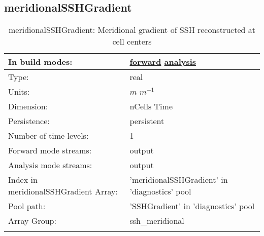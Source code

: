 \subsection[meridionalSSHGradient]{meridionalSSHGradient}
\label{subsec:var_sec_diagnostics_meridionalSSHGradient}
\begin{center}
\begin{longtable}{| p{2.0in} | p{4.0in} |}
        \hline 
        In build modes: & \hyperref[subsec:forward_var_tab_diagnostics]{forward} \hyperref[subsec:analysis_var_tab_diagnostics]{analysis} \\
        \hline 
        Type: & real \\
        \hline 
        Units: & $m$ $m^{-1}$ \\
        \hline 
        Dimension: & nCells Time \\
        \hline 
        Persistence: & persistent \\
        \hline 
        Number of time levels: & 1 \\
        \hline 
		 Forward mode streams: &  output \\
        \hline 
		 Analysis mode streams: &  output \\
        \hline 
		 Index in meridionalSSHGradient Array: & 'meridionalSSHGradient' in 'diagnostics' pool \\
		 \hline 
            Pool path: & 'SSHGradient' in 'diagnostics' pool
 \\
		 \hline 
		 Array Group: & ssh\_meridional \\
		 \hline 
    \caption{meridionalSSHGradient: Meridional gradient of SSH reconstructed at cell centers}
\end{longtable}
\end{center}

